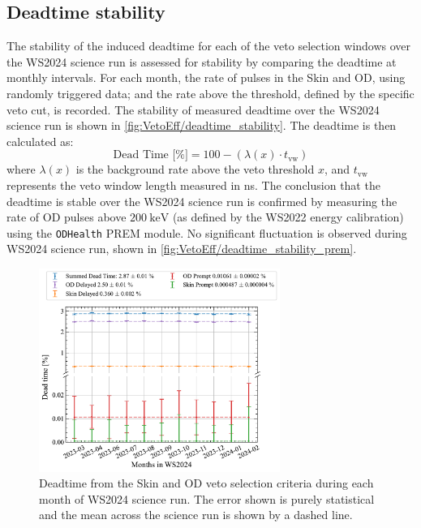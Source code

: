 \subsection{Deadtime stability}\label{sec:VetoEff/DeadtimeStability}
The stability of the induced deadtime for each of the veto selection windows over the WS2024 science run is assessed for stability by comparing the deadtime at monthly intervals. For each month, the rate of pulses in the Skin and OD, using randomly triggered data; and the rate above the threshold, defined by the specific veto cut, is recorded. The stability of measured deadtime over the WS2024 science run is shown in \autoref{fig:VetoEff/deadtime_stability}.
The deadtime is then calculated as:
\begin{equation}
	\textrm{Dead Time [\%]} = 100 - (\lambda(x)\cdot t_{\text{vw}})
\end{equation}
where $\lambda(x)$ is the background rate above the veto threshold $x$, and $t_{\text{vw}}$ represents the veto window length measured in ns.
The conclusion that the deadtime is stable over the WS2024 science run is confirmed by measuring the rate of OD pulses above $200~\text{keV}$ (as defined by the WS2022 energy calibration) using the \lstinline{ODHealth} PREM module. No significant fluctuation is observed during WS2024 science run, shown in \autoref{fig:VetoEff/deadtime_stability_prem}.
\begin{figure}[!ht]
	\centering
	\includegraphics[width=0.7\textwidth]{figures/VetoEfficiency/SR3DeadTimeAll_withMean.pdf}
	\caption[Deadtime from the Skin and OD veto selection criteria during each month of WS2024 science run.]{Deadtime from the Skin and OD veto selection criteria during each month of WS2024 science run. The error shown is purely statistical and the mean across the science run is shown by a dashed line.}
	\label{fig:VetoEff/deadtime_stability}
\end{figure}
